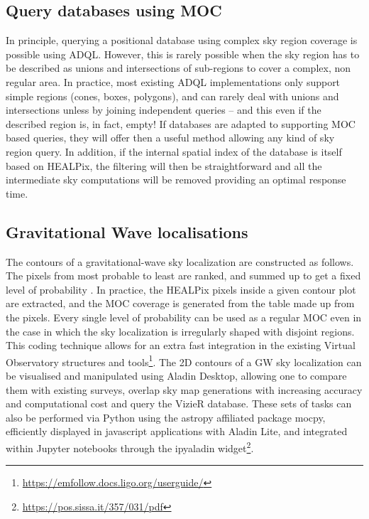 \documentclass[11pt,a4paper]{ivoa}
\begin{document}
\subsection{Query databases using MOC}
In principle, querying a positional database using complex sky region
coverage is possible using ADQL. However, this is rarely possible
when the sky region has to be described as unions and intersections of
sub-regions to cover a complex, non regular area. In practice, most
existing ADQL implementations only support simple regions
(cones, boxes, polygons), and can rarely deal with unions and
intersections unless by joining independent queries – and this even if
the described region is, in fact, empty!  If databases are adapted to
supporting MOC based queries, they will offer then a useful method
allowing any kind of sky region query. In addition, if the internal
spatial index of the database is itself based on HEALPix, the
filtering will then be straightforward and all the intermediate sky
computations will be removed providing an optimal response time.

\subsection{Gravitational Wave localisations}
The contours of a gravitational-wave sky localization are constructed
as follows. The pixels from most probable to least are ranked, and summed
up to get a fixed level of probability \citep{2014ApJ...795..105S}.
In practice, the HEALPix pixels inside a given contour plot are extracted,
and the MOC coverage is generated from the table made up from the pixels.
Every single level of probability can be used as a regular MOC even in the case in
which the sky localization is irregularly shaped with disjoint regions.
This coding technique allows for an extra fast integration in the existing
Virtual Observatory structures and tools\footnote{\url{https://emfollow.docs.ligo.org/userguide/}}. 
The 2D contours of a GW sky localization can be visualised and
manipulated using Aladin Desktop, allowing one to compare them with
existing surveys, overlap sky map generations with increasing accuracy
and computational cost and query the VizieR database. 
These sets of tasks can also be performed via Python using the astropy
affiliated package mocpy, efficiently displayed in javascript applications
with Aladin Lite, and integrated within Jupyter notebooks through the
ipyaladin widget\footnote{\url{https://pos.sissa.it/357/031/pdf}}. 
\end{document}
